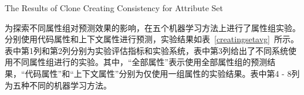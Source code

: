 
{The Results of Clone Creating Consistency for Attribute Set}

为探索不同属性组对预测效果的影响，在五个机器学习方法上进行了属性组实验。分别使用代码属性和上下文属性进行预测，实验结果如表~\ref{creatingsetavg}~所示。表中第1列和第2列分别为实验评估指标和实验系统，表中第3列给出了不同系统使用不同属性组进行的实验。其中，“全部属性”表示使用全部属性组的预测结果，“代码属性”和“上下文属性”分别为仅使用一组属性的实验结果。表中第4 - 8列为五种不同的机器学习方法。%


